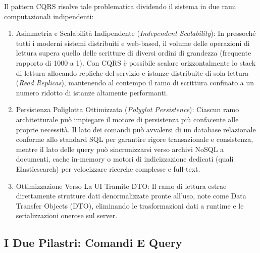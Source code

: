 \documentclass[11pt, a4paper]{article}
\begin{document}
Il pattern CQRS risolve tale problematica dividendo il sistema in due rami computazionali indipendenti:
\begin{enumerate}
    \item Asimmetria e Scalabilità Indipendente (\emph{Independent Scalability}):
    In pressoché tutti i moderni sistemi distribuiti e web-based, il volume delle operazioni di lettura supera quello delle scritture di diversi ordini di grandezza (frequente rapporto di 1000 a 1). Con CQRS è possibile scalare orizzontalmente lo stack di lettura allocando repliche del servizio e istanze distribuite di sola lettura (\emph{Read Replicas}), mantenendo al contempo il ramo di scrittura confinato a un numero ridotto di istanze altamente performanti.

    \item Persistenza Poliglotta Ottimizzata (\emph{Polyglot Persistence}):
    Ciascun ramo architetturale può impiegare il motore di persistenza più confacente alle proprie necessità. Il lato dei comandi può avvalersi di un database relazionale conforme allo standard SQL per garantire rigore transazionale e consistenza, mentre il lato delle query può sincronizzarsi verso archivi NoSQL a documenti, cache in-memory o motori di indicizzazione dedicati (quali Elasticsearch) per velocizzare ricerche complesse e full-text.

    \item Ottimizzazione Verso La UI Tramite DTO:
    Il ramo di lettura estrae direttamente strutture dati denormalizzate pronte all'uso, note come Data Transfer Objects (DTO), eliminando le trasformazioni dati a runtime e le serializzazioni onerose sul server.
\end{enumerate}

\subsection{I Due Pilastri: Comandi E Query}

\end{document}
